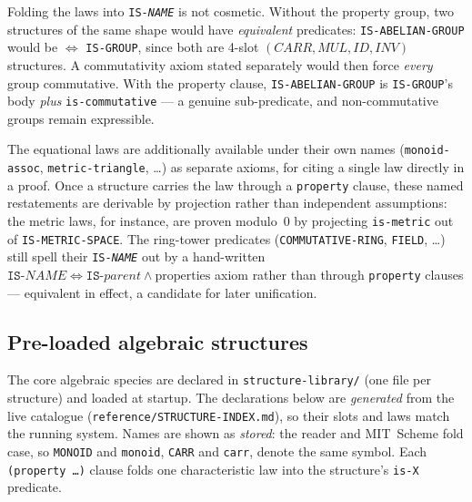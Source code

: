 \begin{remark}
Folding the laws into \texttt{IS-\textit{NAME}} is not cosmetic.  Without
the property group, two structures of the same shape would have
\emph{equivalent} predicates: \texttt{IS-ABELIAN-GROUP} would be
$\Leftrightarrow$ \texttt{IS-GROUP}, since both are 4-slot
$(\mathit{CARR}, \mathit{MUL}, \mathit{ID}, \mathit{INV})$ structures.  A
commutativity axiom stated separately would then force \emph{every}
group commutative.  With the property clause, \texttt{IS-ABELIAN-GROUP}
is \texttt{IS-GROUP}'s body \emph{plus} \texttt{is-commutative} --- a
genuine sub-predicate, and non-commutative groups remain expressible.
\end{remark}

\begin{remark}
The equational laws are additionally available under their own names
(\texttt{monoid-assoc}, \texttt{metric-triangle}, \ldots) as separate
axioms, for citing a single law directly in a proof.  Once a structure
carries the law through a \texttt{property} clause, these named
restatements are derivable by projection rather than independent
assumptions: the metric laws, for instance, are proven modulo~0 by
projecting \texttt{is-metric} out of \texttt{IS-METRIC-SPACE}.  The
ring-tower predicates
(\texttt{COMMUTATIVE-RING}, \texttt{FIELD}, \ldots) still spell their
\texttt{IS-\textit{NAME}} out by a hand-written
$\texttt{IS-}\mathit{NAME} \Leftrightarrow \texttt{IS-}\mathit{parent}
\land \text{properties}$ axiom rather than through \texttt{property}
clauses --- equivalent in effect, a candidate for later unification.
\end{remark}

\subsection{Pre-loaded algebraic structures}
\label{sec:algebraic}

The core algebraic species are declared in \texttt{structure-library/} (one file
per structure) and loaded at startup.  The declarations below are \emph{generated}
from the live catalogue (\texttt{reference/STRUCTURE-INDEX.md}), so their slots and
laws match the running system.  Names are shown as \emph{stored}: the reader and
MIT~Scheme fold case, so \texttt{MONOID} and \texttt{monoid}, \texttt{CARR} and
\texttt{carr}, denote the same symbol.  Each \texttt{(property \ldots)} clause folds
one characteristic law into the structure's \texttt{is-X} predicate.

